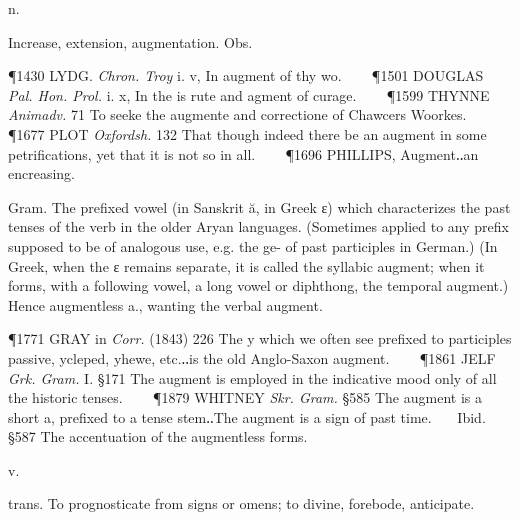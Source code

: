 \begin{description}[wide, labelwidth=!, labelindent=0pt]
 n.

\noindent {}

\vspace{-0.3cm}

\begin{myenumerate}

 Increase, extension, augmentation. Obs.

\P 1430 LYDG.  \textit{Chron. Troy} i. v, In augment of thy wo.    
\P 1501 DOUGLAS  \textit{Pal. Hon. Prol.} i. x, In the is rute and agment of curage.    
\P 1599 THYNNE  \textit{Animadv.} 71 To seeke the augmente and correctione of Chawcers Woorkes.    
\P 1677 PLOT  \textit{Oxfordsh.} 132 That though indeed there be an augment in some petrifications, yet that it is not so in all.    
\P 1696 PHILLIPS, Augment‥an encreasing.

 Gram. The prefixed vowel (in Sanskrit ă, in Greek ε) which characterizes the past tenses of the verb in the older Aryan languages. (Sometimes applied to any prefix supposed to be of analogous use, e.g. the ge- of past participles in German.)
(In Greek, when the ε remains separate, it is called the syllabic augment; when it forms, with a following vowel, a long vowel or diphthong, the temporal augment.) Hence augmentless a., wanting the verbal augment.

\P 1771 GRAY in \textit{Corr.} (1843) 226 The y which we often see prefixed to participles passive, ycleped, yhewe, etc.‥is the old Anglo-Saxon augment.    
\P 1861 JELF  \textit{Grk. Gram.} I. §171 The augment is employed in the indicative mood only of all the historic tenses.    
\P 1879 WHITNEY  \textit{Skr. Gram.} §585 The augment is a short a, prefixed to a tense stem‥The augment is a sign of past time.    Ibid. §587 The accentuation of the augmentless forms.
\end{myenumerate}


 v.

\noindent {}

\vspace{-0.3cm}

\begin{myenumerate}

 trans. To prognosticate from signs or omens; to divine, forebode, anticipate.


\end{myenumerate}
\end{description}
